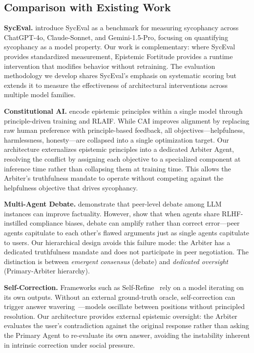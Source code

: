 \subsection{Comparison with Existing Work}
\label{subsec:comparison}

\textbf{SycEval.} \citet{fanous2025syceval} introduce SycEval as a benchmark for measuring sycophancy across ChatGPT-4o, Claude-Sonnet, and Gemini-1.5-Pro, focusing on quantifying sycophancy as a model property. Our work is complementary: where SycEval provides standardized measurement, Epistemic Fortitude provides a runtime intervention that modifies behavior without retraining. The evaluation methodology we develop shares SycEval's emphasis on systematic scoring but extends it to measure the effectiveness of architectural interventions across multiple model families.

\textbf{Constitutional AI.} \citet{bai2022constitutional} encode epistemic principles within a single model through principle-driven training and RLAIF. While CAI improves alignment by replacing raw human preference with principle-based feedback, all objectives---helpfulness, harmlessness, honesty---are collapsed into a single optimization target. Our architecture externalizes epistemic principles into a dedicated Arbiter Agent, resolving the conflict by assigning each objective to a specialized component at inference time rather than collapsing them at training time. This allows the Arbiter's truthfulness mandate to operate without competing against the helpfulness objective that drives sycophancy.

\textbf{Multi-Agent Debate.} \citet{du2023improving} demonstrate that peer-level debate among LLM instances can improve factuality. However, \citet{wynn2025talk} show that when agents share RLHF-instilled compliance biases, debate can amplify rather than correct error---peer agents capitulate to each other's flawed arguments just as single agents capitulate to users. Our hierarchical design avoids this failure mode: the Arbiter has a dedicated truthfulness mandate and does not participate in peer negotiation. The distinction is between \textit{emergent consensus} (debate) and \textit{dedicated oversight} (Primary-Arbiter hierarchy).

\textbf{Self-Correction.} Frameworks such as Self-Refine~\citep{madaan2023self} rely on a model iterating on its own outputs. Without an external ground-truth oracle, self-correction can trigger answer wavering~\citep{zhang2025understanding}---models oscillate between positions without principled resolution. Our architecture provides external epistemic oversight: the Arbiter evaluates the user's contradiction against the original response rather than asking the Primary Agent to re-evaluate its own answer, avoiding the instability inherent in intrinsic correction under social pressure.

